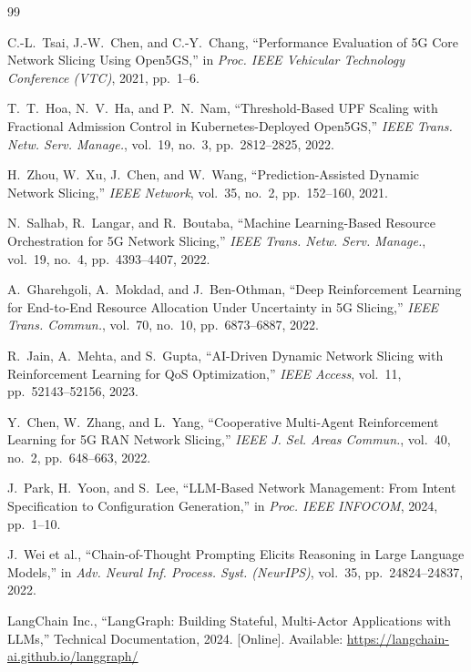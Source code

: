 \documentclass[12pt]{article}
\begin{document}
\begin{thebibliography}{99}

C.-L.~Tsai, J.-W.~Chen, and C.-Y.~Chang, ``Performance Evaluation of
5G Core Network Slicing Using Open5GS,'' in \textit{Proc. IEEE Vehicular
Technology Conference (VTC)}, 2021, pp.~1--6.

T.~T.~Hoa, N.~V.~Ha, and P.~N.~Nam, ``Threshold-Based UPF Scaling with
Fractional Admission Control in Kubernetes-Deployed Open5GS,''
\textit{IEEE Trans. Netw. Serv. Manage.}, vol.~19, no.~3,
pp.~2812--2825, 2022.

H.~Zhou, W.~Xu, J.~Chen, and W.~Wang, ``Prediction-Assisted Dynamic
Network Slicing,'' \textit{IEEE Network}, vol.~35, no.~2,
pp.~152--160, 2021.

N.~Salhab, R.~Langar, and R.~Boutaba, ``Machine Learning-Based Resource
Orchestration for 5G Network Slicing,'' \textit{IEEE Trans. Netw. Serv.
Manage.}, vol.~19, no.~4, pp.~4393--4407, 2022.

A.~Gharehgoli, A.~Mokdad, and J.~Ben-Othman, ``Deep Reinforcement
Learning for End-to-End Resource Allocation Under Uncertainty in 5G
Slicing,'' \textit{IEEE Trans. Commun.}, vol.~70, no.~10,
pp.~6873--6887, 2022.

R.~Jain, A.~Mehta, and S.~Gupta, ``AI-Driven Dynamic Network Slicing
with Reinforcement Learning for QoS Optimization,'' \textit{IEEE Access},
vol.~11, pp.~52143--52156, 2023.

Y.~Chen, W.~Zhang, and L.~Yang, ``Cooperative Multi-Agent Reinforcement
Learning for 5G RAN Network Slicing,'' \textit{IEEE J. Sel. Areas
Commun.}, vol.~40, no.~2, pp.~648--663, 2022.

J.~Park, H.~Yoon, and S.~Lee, ``LLM-Based Network Management: From
Intent Specification to Configuration Generation,'' in \textit{Proc.
IEEE INFOCOM}, 2024, pp.~1--10.

J.~Wei et al., ``Chain-of-Thought Prompting Elicits Reasoning in Large
Language Models,'' in \textit{Adv. Neural Inf. Process. Syst. (NeurIPS)},
vol.~35, pp.~24824--24837, 2022.

LangChain Inc., ``LangGraph: Building Stateful, Multi-Actor Applications
with LLMs,'' Technical Documentation, 2024. [Online]. Available:
\url{https://langchain-ai.github.io/langgraph/}


\end{thebibliography}
\end{document}
